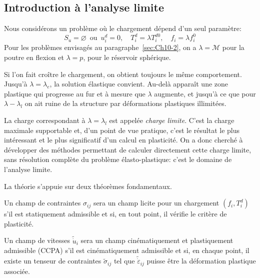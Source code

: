\subsection{Introduction à l'analyse limite} \label{ssec:Ch10-3.2}
Nous considérons un problème où le chargement dépend d'un seul paramètre: 
\begin{equation}
        S_u = \varnothing \,\text{ ou }\, u_i^d = 0, \quad
        T_i^d = \lambda T_i^{d0}, \quad f_i = \lambda f_i^0
    \label{eq:Ch10-054}
\end{equation}
Pour les problèmes envisagés au paragraphe~\ref{sec:Ch10-2}, on  a $\lambda = \mathcal{M}$ pour la poutre en flexion et $\lambda=p$, pour le réservoir sphérique.  

Si l'on fait croître le chargement, on obtient toujours le même comportement.
Jusqu'à $\lambda=\lambda_e$, la solution élastique convient.
Au-delà apparaît une zone plastique qui progresse au fur et à mesure que $\lambda$ augmente, et jusqu'à ce que pour $\lambda-\lambda_l$ on ait ruine de la structure par déformations plastiques illimitées. 

La charge correspondant à $\lambda=\lambda_l$ est appelée \emph{charge limite}.
C'est la charge maximale supportable et, d'un point de vue pratique, c'est le résultat le plus intéressant et le plus significatif d'un calcul en plasticité.
On a donc cherché à développer des méthodes permettant de calculer directement cette charge limite, sans résolution complète du problème élasto-plastique: c'est le domaine de l'analyse limite. 

La théorie s'appuie sur deux théorèmes fondamentaux. 
\begin{deff}
    Un champ de contraintes $\hat{\sigma}_{ij}$ sera un champ licite pour un chargement $(f_i,T_i^d)$ s'il est statiquement admissible et si, en tout point, il vérifie le critère de plasticité. 
\end{deff}
\begin{deff}
    Un champ de vitesses $\tilde{\dot{u}}_i$ sera un champ cinématiquement et plastiquement admissible (CCPA) s'il est cinématiquement admissible et si, en chaque point, il existe un  tenseur de contraintes $\tilde{\sigma}_{ij}$ tel que $\tilde{\dot{\varepsilon}}_{ij}$ puisse être la déformation plastique associée.  
\end{deff}

